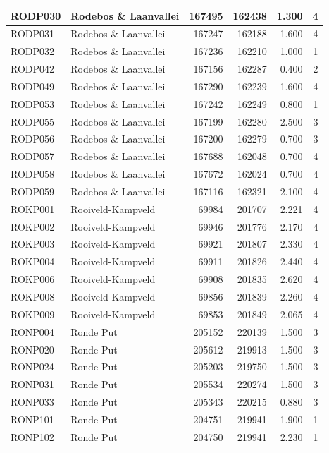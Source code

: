 \documentclass[11pt,]{book}
\begin{document}
\begin{table}
\begin{tabular}[t]{l|l|r|r|r|r}
\hline
RODP030 & Rodebos \& Laanvallei & 167495 & 162438 & 1.300 & 4\\
\hline
RODP031 & Rodebos \& Laanvallei & 167247 & 162188 & 1.600 & 4\\
\hline
RODP032 & Rodebos \& Laanvallei & 167236 & 162210 & 1.000 & 1\\
\hline
RODP042 & Rodebos \& Laanvallei & 167156 & 162287 & 0.400 & 2\\
\hline
RODP049 & Rodebos \& Laanvallei & 167290 & 162239 & 1.600 & 4\\
\hline
RODP053 & Rodebos \& Laanvallei & 167242 & 162249 & 0.800 & 1\\
\hline
RODP055 & Rodebos \& Laanvallei & 167199 & 162280 & 2.500 & 3\\
\hline
RODP056 & Rodebos \& Laanvallei & 167200 & 162279 & 0.700 & 3\\
\hline
RODP057 & Rodebos \& Laanvallei & 167688 & 162048 & 0.700 & 4\\
\hline
RODP058 & Rodebos \& Laanvallei & 167672 & 162024 & 0.700 & 4\\
\hline
RODP059 & Rodebos \& Laanvallei & 167116 & 162321 & 2.100 & 4\\
\hline
ROKP001 & Rooiveld-Kampveld & 69984 & 201707 & 2.221 & 4\\
\hline
ROKP002 & Rooiveld-Kampveld & 69946 & 201776 & 2.170 & 4\\
\hline
ROKP003 & Rooiveld-Kampveld & 69921 & 201807 & 2.330 & 4\\
\hline
ROKP004 & Rooiveld-Kampveld & 69911 & 201826 & 2.440 & 4\\
\hline
ROKP006 & Rooiveld-Kampveld & 69908 & 201835 & 2.620 & 4\\
\hline
ROKP008 & Rooiveld-Kampveld & 69856 & 201839 & 2.260 & 4\\
\hline
ROKP009 & Rooiveld-Kampveld & 69853 & 201849 & 2.065 & 4\\
\hline
RONP004 & Ronde Put & 205152 & 220139 & 1.500 & 3\\
\hline
RONP020 & Ronde Put & 205612 & 219913 & 1.500 & 3\\
\hline
RONP024 & Ronde Put & 205203 & 219750 & 1.500 & 3\\
\hline
RONP031 & Ronde Put & 205534 & 220274 & 1.500 & 3\\
\hline
RONP033 & Ronde Put & 205343 & 220215 & 0.880 & 3\\
\hline
RONP101 & Ronde Put & 204751 & 219941 & 1.900 & 1\\
\hline
RONP102 & Ronde Put & 204750 & 219941 & 2.230 & 1\\

\end{tabular}
\end{table}
\end{document}
